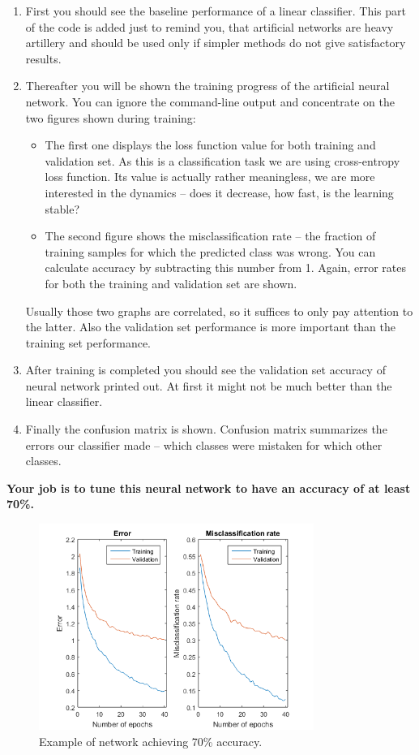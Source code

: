\documentclass[a4paper,11pt]{article}
\begin{document}
\begin{enumerate}
	\item First you should see the baseline performance of a linear classifier. This part of the code is added just to remind you, that artificial networks are heavy artillery and should be used only if simpler methods do not give satisfactory results. 
	\item Thereafter you will be shown the training progress of the artificial neural network. You can ignore the command-line output and concentrate on the two figures shown during training:
	\begin{itemize}
		\item The first one displays the loss function value for both training and validation set. As this is a classification task we are using cross-entropy loss function. Its value is actually rather meaningless, we are more interested in the dynamics -- does it decrease, how fast, is the learning stable?
		\item The second figure shows the misclassification rate -- the fraction of training samples for which the predicted class was wrong. You can calculate accuracy by subtracting this number from 1. Again, error rates for both the training and validation set are shown.
	\end{itemize}
	Usually those two graphs are correlated, so it suffices to only pay attention to the latter. Also the validation set performance is more important than the training set performance.
	\item After training is completed you should see the validation set accuracy of neural network printed out. At first it might not be much better than the linear classifier.
	\item Finally the confusion matrix is shown. Confusion matrix summarizes the errors our classifier made -- which classes were mistaken for which other classes.
\end{enumerate}

\textbf{Your job is to tune this neural network to have an accuracy of at least 70\%.}\\

\begin{figure}[h]
	\centering
	\includegraphics[width=0.8\textwidth]{training_loss.png}
	\caption{Example of network achieving 70\% accuracy.}
\end{figure}
\end{document}
